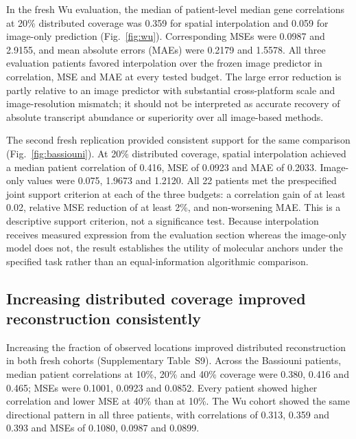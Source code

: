 

In the fresh Wu evaluation, the median of patient-level median gene correlations at 20\% distributed coverage was 0.359 for spatial interpolation and 0.059 for image-only prediction (Fig.~\ref{fig:wu}). Corresponding MSEs were 0.0987 and 2.9155, and mean absolute errors (MAEs) were 0.2179 and 1.5578. All three evaluation patients favored interpolation over the frozen image predictor in correlation, MSE and MAE at every tested budget. The large error reduction is partly relative to an image predictor with substantial cross-platform scale and image-resolution mismatch; it should not be interpreted as accurate recovery of absolute transcript abundance or superiority over all image-based methods.



The second fresh replication provided consistent support for the same comparison (Fig.~\ref{fig:bassiouni}). At 20\% distributed coverage, spatial interpolation achieved a median patient correlation of 0.416, MSE of 0.0923 and MAE of 0.2033. Image-only values were 0.075, 1.9673 and 1.2120. All 22 patients met the prespecified joint support criterion at each of the three budgets: a correlation gain of at least 0.02, relative MSE reduction of at least 2\%, and non-worsening MAE. This is a descriptive support criterion, not a significance test. Because interpolation receives measured expression from the evaluation section whereas the image-only model does not, the result establishes the utility of molecular anchors under the specified task rather than an equal-information algorithmic comparison.




\subsection{Increasing distributed coverage improved reconstruction consistently}
Increasing the fraction of observed locations improved distributed reconstruction in both fresh cohorts (Supplementary Table~S9). Across the Bassiouni patients, median patient correlations at 10\%, 20\% and 40\% coverage were 0.380, 0.416 and 0.465; MSEs were 0.1001, 0.0923 and 0.0852. Every patient showed higher correlation and lower MSE at 40\% than at 10\%. The Wu cohort showed the same directional pattern in all three patients, with correlations of 0.313, 0.359 and 0.393 and MSEs of 0.1080, 0.0987 and 0.0899.

